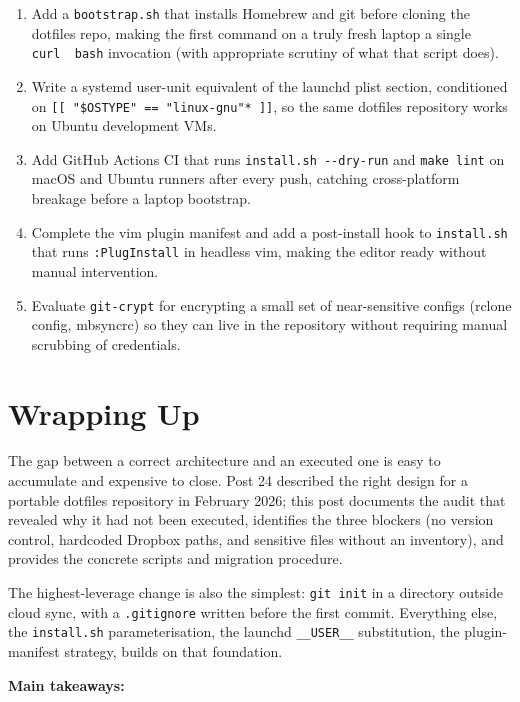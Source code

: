 \documentclass[
  11pt,
  letterpaper,
  DIV=11,
  numbers=noendperiod]{scrartcl}
\providecommand{\tightlist}{%
  \setlength{\itemsep}{0pt}\setlength{\parskip}{0pt}}
\begin{document}
\begin{enumerate}
\def\labelenumi{\arabic{enumi}.}
\tightlist
\item
  Add a \texttt{bootstrap.sh} that installs Homebrew and git before
  cloning the dotfiles repo, making the first command on a truly fresh
  laptop a single \texttt{curl\ \textbar{}\ bash} invocation (with
  appropriate scrutiny of what that script does).
\item
  Write a systemd user-unit equivalent of the launchd plist section,
  conditioned on \texttt{{[}{[}\ "\$OSTYPE"\ ==\ "linux-gnu"*\ {]}{]}},
  so the same dotfiles repository works on Ubuntu development VMs.
\item
  Add GitHub Actions CI that runs \texttt{install.sh\ -\/-dry-run} and
  \texttt{make\ lint} on macOS and Ubuntu runners after every push,
  catching cross-platform breakage before a laptop bootstrap.
\item
  Complete the vim plugin manifest and add a post-install hook to
  \texttt{install.sh} that runs \texttt{:PlugInstall} in headless vim,
  making the editor ready without manual intervention.
\item
  Evaluate \texttt{git-crypt} for encrypting a small set of
  near-sensitive configs (rclone config, mbsyncrc) so they can live in
  the repository without requiring manual scrubbing of credentials.
\end{enumerate}

\section{Wrapping Up}\label{wrapping-up}

The gap between a correct architecture and an executed one is easy to
accumulate and expensive to close. Post 24 described the right design
for a portable dotfiles repository in February 2026; this post documents
the audit that revealed why it had not been executed, identifies the
three blockers (no version control, hardcoded Dropbox paths, and
sensitive files without an inventory), and provides the concrete scripts
and migration procedure.

The highest-leverage change is also the simplest: \texttt{git\ init} in
a directory outside cloud sync, with a \texttt{.gitignore} written
before the first commit. Everything else, the \texttt{install.sh}
parameterisation, the launchd \texttt{\_\_USER\_\_} substitution, the
plugin-manifest strategy, builds on that foundation.

\textbf{Main takeaways:}
\end{document}
